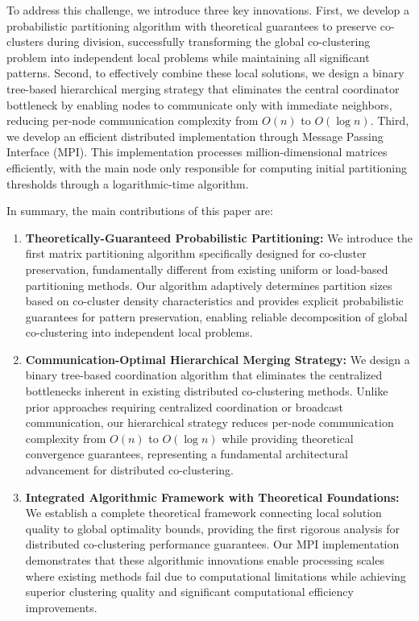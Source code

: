 \documentclass[journal]{IEEEtran}
\begin{document}
To address this challenge, we introduce three key innovations. First, we develop a probabilistic partitioning algorithm with theoretical guarantees to preserve co-clusters during division, successfully transforming the global co-clustering problem into independent local problems while maintaining all significant patterns. Second, to effectively combine these local solutions, we design a binary tree-based hierarchical merging strategy that eliminates the central coordinator bottleneck by enabling nodes to communicate only with immediate neighbors, reducing per-node communication complexity from $O(n)$ to $O(\log n)$. Third, we develop an efficient distributed implementation through Message Passing Interface (MPI). This implementation processes million-dimensional matrices efficiently, with the main node only responsible for computing initial partitioning thresholds through a logarithmic-time algorithm.

In summary, the main contributions of this paper are:
{\color{blue}\begin{enumerate}
    \item \textbf{Theoretically-Guaranteed Probabilistic Partitioning:} We introduce the first matrix partitioning algorithm specifically designed for co-cluster preservation, fundamentally different from existing uniform or load-based partitioning methods. Our algorithm adaptively determines partition sizes based on co-cluster density characteristics and provides explicit probabilistic guarantees for pattern preservation, enabling reliable decomposition of global co-clustering into independent local problems.

    \item \textbf{Communication-Optimal Hierarchical Merging Strategy:} We design a binary tree-based coordination algorithm that eliminates the centralized bottlenecks inherent in existing distributed co-clustering methods. Unlike prior approaches requiring centralized coordination or broadcast communication, our hierarchical strategy reduces per-node communication complexity from $O(n)$ to $O(\log n)$ while providing theoretical convergence guarantees, representing a fundamental architectural advancement for distributed co-clustering.

    \item \textbf{Integrated Algorithmic Framework with Theoretical Foundations:} We establish a complete theoretical framework connecting local solution quality to global optimality bounds, providing the first rigorous analysis for distributed co-clustering performance guarantees. Our MPI implementation demonstrates that these algorithmic innovations enable processing scales where existing methods fail due to computational limitations while achieving superior clustering quality and significant computational efficiency improvements.
\end{enumerate}
}
\end{document}
